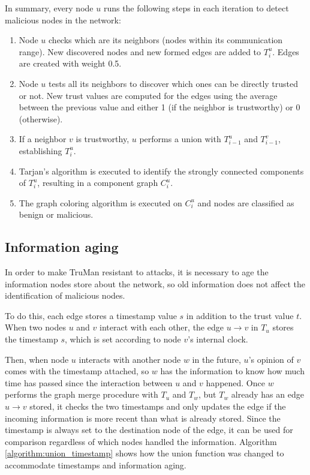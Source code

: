 In summary, every node $u$ runs the following steps in each iteration to detect malicious nodes in the network:

\begin{enumerate}
	\item Node $u$ checks which are its neighbors (nodes within its communication range).
		  New discovered nodes and new formed edges are added to $T^u_i$.
		  Edges are created with weight 0.5.
	\item Node $u$ tests all its neighbors to discover which ones can be directly trusted or not.
		  New trust values are computed for the edges using the average between the previous value and either 1 (if the neighbor is trustworthy) or 0 (otherwise).
	\item If a neighbor $v$ is trustworthy, $u$ performs a union with $T^u_{i-1}$ and $T^v_{i-1}$, establishing $T^u_i$.
	\item Tarjan's algorithm is executed to identify the strongly connected components of $T^u_i$, resulting in a component graph $C^u_i$.
	\item The graph coloring algorithm is executed on $C^u_i$ and nodes are classified as benign or malicious.
\end{enumerate}

\subsection{Information aging}

In order to make TruMan resistant to attacks, it is necessary to age the information nodes store about the network, so old information does not affect the identification of malicious nodes.

To do this, each edge stores a timestamp value $s$ in addition to the trust value $t$.
When two nodes $u$ and $v$ interact with each other, the edge $u\rightarrow v$ in $T_u$ stores the timestamp $s$, which is set according to node $v$'s internal clock.

Then, when node $u$ interacts with another node $w$ in the future, $u$'s opinion of $v$ comes with the timestamp attached, so $w$ has the information to know how much time has passed since the interaction between $u$ and $v$ happened.
Once $w$ performs the graph merge procedure with $T_u$ and $T_w$, but $T_w$ already has an edge $u\rightarrow v$ stored, it checks the two timestamps and only updates the edge if the incoming information is more recent than what is already stored.
Since the timestamp is always set to the destination node of the edge, it can be used for comparison regardless of which nodes handled the information. 
Algorithm \autoref{algorithm:union_timestamp} shows how the union function was changed to accommodate timestamps and information aging.

